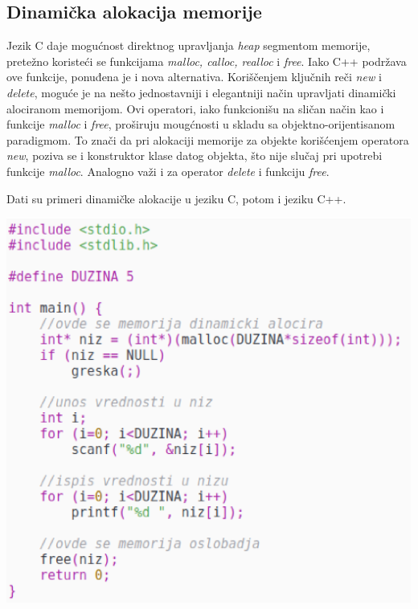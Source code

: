 \documentclass[a4paper]{article}
\begin{document}
{\subsection{Dinamička alokacija memorije}

Jezik C daje mogućnost direktnog upravljanja \emph{heap} segmentom memorije, pretežno koristeći se funkcijama \emph{malloc, calloc, realloc} i \emph{free}. Iako C++ podržava ove funkcije, ponuđena je i nova alternativa. Koriščenjem ključnih reči \emph{new} i \emph{delete}, moguće je na nešto jednostavniji i elegantniji način upravljati dinamički alociranom memorijom. Ovi operatori, iako funkcionišu na sličan način kao i funkcije \emph{malloc} i \emph{free}, proširuju mougćnosti u skladu sa objektno-orijentisanom paradigmom. To znači da pri alokaciji memorije za objekte korišćenjem operatora \emph{new}, poziva se i konstruktor klase datog objekta, što nije slučaj pri upotrebi funkcije \emph{malloc}. Analogno važi i za operator \emph{delete} i funkciju \emph{free}.

Dati su primeri dinamičke alokacije u jeziku C, potom i jeziku C++.

\includegraphics[scale=0.5]{c_kod_dinamicka_alokacija.eps}

}
\end{document}
